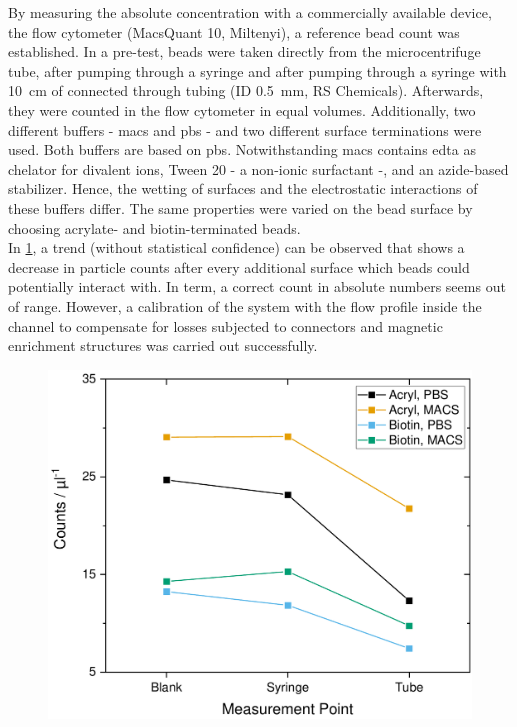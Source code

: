 By measuring the absolute concentration with a commercially available device, the flow cytometer (MacsQuant 10, Miltenyi), a reference bead count was established. In a pre-test, beads were taken directly from the microcentrifuge tube, after pumping through a syringe and after pumping through a syringe with \SI{10}{\centi\meter} of connected through tubing (ID \SI{0.5}{\milli\meter}, RS Chemicals). Afterwards, they were counted in the flow cytometer in equal volumes. Additionally, two different buffers - \gls{macs} and \gls{pbs} - and two different surface terminations were used. Both buffers are based on \acrfull{pbs}. Notwithstanding \gls{macs} contains \gls{edta} as chelator for divalent ions, Tween 20 - a non-ionic surfactant -, and an azide-based stabilizer. Hence, the wetting of surfaces and the electrostatic interactions of these buffers differ. The same properties were varied on the bead surface by choosing acrylate- and biotin-terminated beads.\\
In \cref{fig:conc:losses_syringe}, a trend (without statistical confidence) can be observed that shows a decrease in particle counts after every additional surface which beads could potentially interact with. In term, a correct count in absolute numbers seems out of range. However, a calibration of the system with the flow profile inside the channel to compensate for losses subjected to connectors and magnetic enrichment structures was carried out successfully.
\begin{figure}[b]
	\centering
	\includegraphics[width=.7\linewidth]{Ressources/Concentration/Losses-Syringe-Tubing}
	\label{fig:conc:losses_syringe}
\end{figure}



